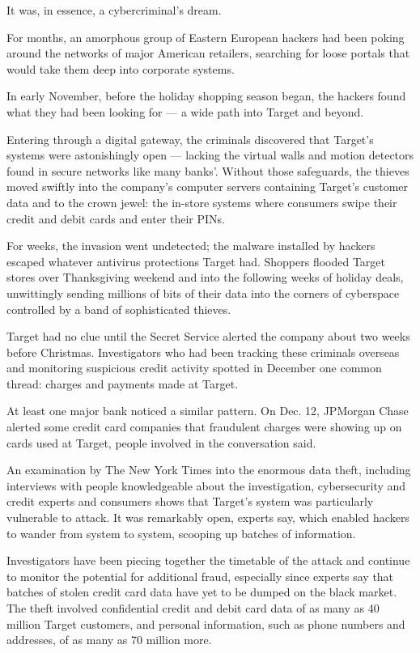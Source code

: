 It was, in essence, a cybercriminal's dream.

For months, an amorphous group of Eastern European hackers had been
poking around the networks of major American retailers, searching for
loose portals that would take them deep into corporate systems.

In early November, before the holiday shopping season began, the hackers
found what they had been looking for --- a wide path into Target and
beyond.

Entering through a digital gateway, the criminals discovered that
Target's systems were astonishingly open --- lacking the virtual walls
and motion detectors found in secure networks like many banks'. Without
those safeguards, the thieves moved swiftly into the company's computer
servers containing Target's customer data and to the crown jewel: the
in-store systems where consumers swipe their credit and debit cards and
enter their PINs.

For weeks, the invasion went undetected; the malware installed by
hackers escaped whatever antivirus protections Target had. Shoppers
flooded Target stores over Thanksgiving weekend and into the following
weeks of holiday deals, unwittingly sending millions of bits of their
data into the corners of cyberspace controlled by a band of
sophisticated thieves.

Target had no clue until the Secret Service alerted the company about
two weeks before Christmas. Investigators who had been tracking these
criminals overseas and monitoring suspicious credit activity spotted in
December one common thread: charges and payments made at Target.

At least one major bank noticed a similar pattern. On Dec. 12, JPMorgan
Chase alerted some credit card companies that fraudulent charges were
showing up on cards used at Target, people involved in the conversation
said.

An examination by The New York Times into the enormous data theft,
including interviews with people knowledgeable about the investigation,
cybersecurity and credit experts and consumers shows that Target's
system was particularly vulnerable to attack. It was remarkably open,
experts say, which enabled hackers to wander from system to system,
scooping up batches of information.

Investigators have been piecing together the timetable of the attack and
continue to monitor the potential for additional fraud, especially since
experts say that batches of stolen credit card data have yet to be
dumped on the black market. The theft involved confidential credit and
debit card data of as many as 40 million Target customers, and personal
information, such as phone numbers and addresses, of as many as 70
million more.

